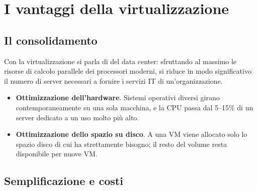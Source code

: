 \section{I vantaggi della virtualizzazione}

\subsection{Il consolidamento}

Con la virtualizzazione si parla di  del data center: sfruttando al massimo le risorse di calcolo
parallele dei processori moderni, si riduce in modo significativo il numero di server necessari a fornire i servizi IT di
un'organizzazione.

\begin{itemize}
  \item \textbf{Ottimizzazione dell'hardware}. Sistemi operativi diversi girano contemporaneamente su una sola macchina, e
        la CPU passa dal 5--15\% di un server dedicato a un uso molto più alto.
  \item \textbf{Ottimizzazione dello spazio su disco}. A una VM viene allocato solo lo spazio disco di cui ha
        strettamente bisogno; il resto del volume resta disponibile per nuove VM.
\end{itemize}

\begin{center}
\end{center}

\subsection{Semplificazione e costi}

